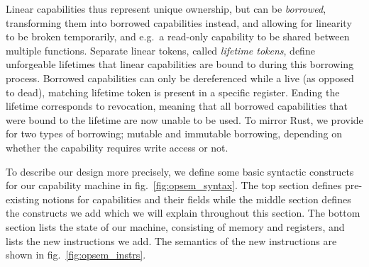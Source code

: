 Linear capabilities thus represent unique ownership, but can be \emph{borrowed}, transforming them into borrowed capabilities instead, and allowing for linearity to be broken temporarily, and e.g.\ a read-only capability to be shared between multiple functions.
Separate linear tokens, called \emph{lifetime tokens}, define unforgeable lifetimes that linear capabilities are bound to during this borrowing process.
Borrowed capabilities can only be dereferenced while a live (as opposed to dead), matching lifetime token is present in a specific register.
Ending the lifetime corresponds to revocation, meaning that all borrowed capabilities that were bound to the lifetime are now unable to be used.
To mirror Rust, we provide for two types of borrowing; mutable and immutable borrowing, depending on whether the capability requires write access or not.

To describe our design more precisely, we define some basic syntactic constructs for our capability machine in fig.\ \ref{fig:opsem_syntax}.
The top section defines pre-existing notions for capabilities and their fields while the middle section defines the constructs we add which we will explain throughout this section.
The bottom section lists the state of our machine, consisting of memory and registers, and lists the new instructions we add.
The semantics of the new instructions are shown in fig.\ \ref{fig:opsem_instrs}.

